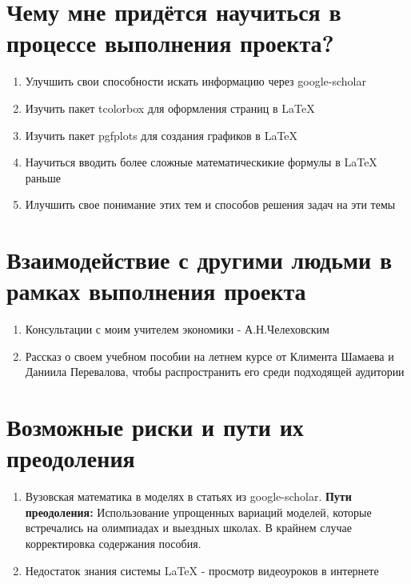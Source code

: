 \section{Чему мне придётся научиться в процессе выполнения проекта?}
\begin{enumerate}
    \item Улучшить свои способности искать информацию через google-scholar
    \item Изучить пакет tcolorbox для оформления страниц в LaTeX
    \item Изучить пакет pgfplots для создания графиков в LaTeX
    \item Научиться вводить более сложные математическикие формулы в LaTeX
    раньше
    \item Илучшить свое понимание этих тем и способов решения задач на эти темы
\end{enumerate}

\section{Взаимодействие с другими людьми в рамках выполнения проекта}
\begin{enumerate}
    \item Консультации с моим учителем экономики - А.Н.Челеховским
    \item Рассказ о своем учебном пособии на летнем курсе от Климента Шамаева и Даниила Перевалова, чтобы
    распространить его среди подходящей аудитории
\end{enumerate}

\section{Возможные риски и пути их преодоления}
\begin{enumerate}
    \item Вузовская математика в моделях в статьях из google-scholar. \textbf{Пути преодоления:} Использование упрощенных вариаций моделей, которые встречались на олимпиадах и выездных школах. В крайнем случае корректировка содержания пособия.
    \item Недостаток знания системы LaTeX - просмотр видеоуроков в интернете
\end{enumerate}

